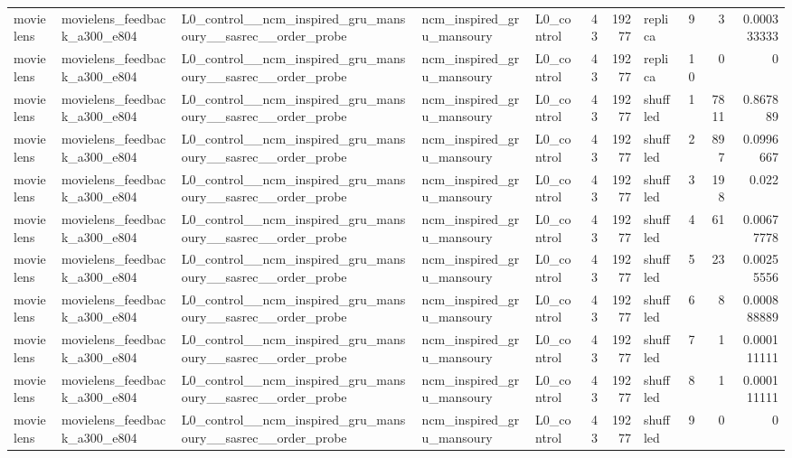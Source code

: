 \begin{table}[htbp!]
\begin{tabular}{lllllrrlrrr}
movielens & movielens\_feedback\_a300\_e804 & L0\_control\_\_ncm\_inspired\_gru\_mansoury\_\_sasrec\_\_order\_probe & ncm\_inspired\_gru\_mansoury & L0\_control & 43 & 19277 & replica & 9 & 3 & 0.000333333 \\
movielens & movielens\_feedback\_a300\_e804 & L0\_control\_\_ncm\_inspired\_gru\_mansoury\_\_sasrec\_\_order\_probe & ncm\_inspired\_gru\_mansoury & L0\_control & 43 & 19277 & replica & 10 & 0 & 0 \\
movielens & movielens\_feedback\_a300\_e804 & L0\_control\_\_ncm\_inspired\_gru\_mansoury\_\_sasrec\_\_order\_probe & ncm\_inspired\_gru\_mansoury & L0\_control & 43 & 19277 & shuffled & 1 & 7811 & 0.867889 \\
movielens & movielens\_feedback\_a300\_e804 & L0\_control\_\_ncm\_inspired\_gru\_mansoury\_\_sasrec\_\_order\_probe & ncm\_inspired\_gru\_mansoury & L0\_control & 43 & 19277 & shuffled & 2 & 897 & 0.0996667 \\
movielens & movielens\_feedback\_a300\_e804 & L0\_control\_\_ncm\_inspired\_gru\_mansoury\_\_sasrec\_\_order\_probe & ncm\_inspired\_gru\_mansoury & L0\_control & 43 & 19277 & shuffled & 3 & 198 & 0.022 \\
movielens & movielens\_feedback\_a300\_e804 & L0\_control\_\_ncm\_inspired\_gru\_mansoury\_\_sasrec\_\_order\_probe & ncm\_inspired\_gru\_mansoury & L0\_control & 43 & 19277 & shuffled & 4 & 61 & 0.00677778 \\
movielens & movielens\_feedback\_a300\_e804 & L0\_control\_\_ncm\_inspired\_gru\_mansoury\_\_sasrec\_\_order\_probe & ncm\_inspired\_gru\_mansoury & L0\_control & 43 & 19277 & shuffled & 5 & 23 & 0.00255556 \\
movielens & movielens\_feedback\_a300\_e804 & L0\_control\_\_ncm\_inspired\_gru\_mansoury\_\_sasrec\_\_order\_probe & ncm\_inspired\_gru\_mansoury & L0\_control & 43 & 19277 & shuffled & 6 & 8 & 0.000888889 \\
movielens & movielens\_feedback\_a300\_e804 & L0\_control\_\_ncm\_inspired\_gru\_mansoury\_\_sasrec\_\_order\_probe & ncm\_inspired\_gru\_mansoury & L0\_control & 43 & 19277 & shuffled & 7 & 1 & 0.000111111 \\
movielens & movielens\_feedback\_a300\_e804 & L0\_control\_\_ncm\_inspired\_gru\_mansoury\_\_sasrec\_\_order\_probe & ncm\_inspired\_gru\_mansoury & L0\_control & 43 & 19277 & shuffled & 8 & 1 & 0.000111111 \\
movielens & movielens\_feedback\_a300\_e804 & L0\_control\_\_ncm\_inspired\_gru\_mansoury\_\_sasrec\_\_order\_probe & ncm\_inspired\_gru\_mansoury & L0\_control & 43 & 19277 & shuffled & 9 & 0 & 0 \\

\end{tabular}
\end{table}
